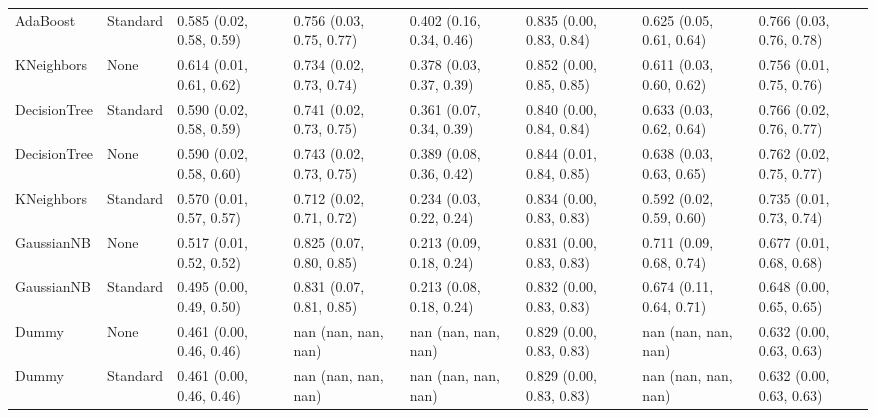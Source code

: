 \begin{tabular}{llllllll}
AdaBoost & Standard & 0.585 (0.02, 0.58, 0.59) & 0.756 (0.03, 0.75, 0.77) & 0.402 (0.16, 0.34, 0.46) & 0.835 (0.00, 0.83, 0.84) & 0.625 (0.05, 0.61, 0.64) & 0.766 (0.03, 0.76, 0.78) \\
KNeighbors & None & 0.614 (0.01, 0.61, 0.62) & 0.734 (0.02, 0.73, 0.74) & 0.378 (0.03, 0.37, 0.39) & 0.852 (0.00, 0.85, 0.85) & 0.611 (0.03, 0.60, 0.62) & 0.756 (0.01, 0.75, 0.76) \\
DecisionTree & Standard & 0.590 (0.02, 0.58, 0.59) & 0.741 (0.02, 0.73, 0.75) & 0.361 (0.07, 0.34, 0.39) & 0.840 (0.00, 0.84, 0.84) & 0.633 (0.03, 0.62, 0.64) & 0.766 (0.02, 0.76, 0.77) \\
DecisionTree & None & 0.590 (0.02, 0.58, 0.60) & 0.743 (0.02, 0.73, 0.75) & 0.389 (0.08, 0.36, 0.42) & 0.844 (0.01, 0.84, 0.85) & 0.638 (0.03, 0.63, 0.65) & 0.762 (0.02, 0.75, 0.77) \\
KNeighbors & Standard & 0.570 (0.01, 0.57, 0.57) & 0.712 (0.02, 0.71, 0.72) & 0.234 (0.03, 0.22, 0.24) & 0.834 (0.00, 0.83, 0.83) & 0.592 (0.02, 0.59, 0.60) & 0.735 (0.01, 0.73, 0.74) \\
GaussianNB & None & 0.517 (0.01, 0.52, 0.52) & 0.825 (0.07, 0.80, 0.85) & 0.213 (0.09, 0.18, 0.24) & 0.831 (0.00, 0.83, 0.83) & 0.711 (0.09, 0.68, 0.74) & 0.677 (0.01, 0.68, 0.68) \\
GaussianNB & Standard & 0.495 (0.00, 0.49, 0.50) & 0.831 (0.07, 0.81, 0.85) & 0.213 (0.08, 0.18, 0.24) & 0.832 (0.00, 0.83, 0.83) & 0.674 (0.11, 0.64, 0.71) & 0.648 (0.00, 0.65, 0.65) \\
Dummy & None & 0.461 (0.00, 0.46, 0.46) & nan (nan, nan, nan) & nan (nan, nan, nan) & 0.829 (0.00, 0.83, 0.83) & nan (nan, nan, nan) & 0.632 (0.00, 0.63, 0.63) \\
Dummy & Standard & 0.461 (0.00, 0.46, 0.46) & nan (nan, nan, nan) & nan (nan, nan, nan) & 0.829 (0.00, 0.83, 0.83) & nan (nan, nan, nan) & 0.632 (0.00, 0.63, 0.63) \\
\bottomrule
\end{tabular}

